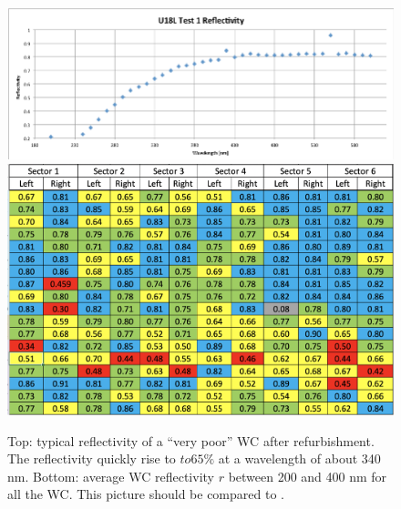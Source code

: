 \begin{figure}
	\centering
	\includegraphics[width=0.95\columnwidth,keepaspectratio]{img/winstoConeSample1Reflectivity.png}
	\includegraphics[width=0.95\columnwidth,keepaspectratio]{img/wcStatusAfter.png}
	\caption{Top: typical reflectivity of a ``very poor'' WC after refurbishment.
            The reflectivity quickly rise to $to 65\%$ at a wavelength of about 340 nm. Bottom: average WC reflectivity  $r$ between 200 and 400 nm for
				all the WC. This picture should be compared to . }
	\label{fig:wcStatusAfter}
\end{figure}



